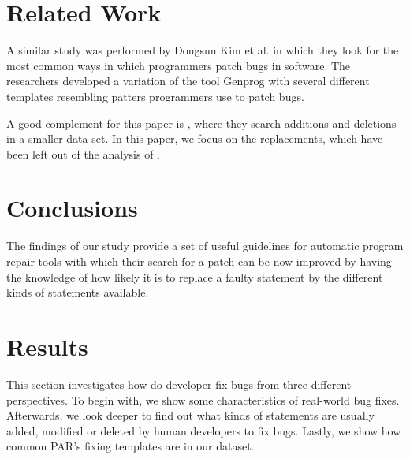 \documentclass{sig-alternate-05-2015}
\begin{document}
\section{Related Work}
A similar study was performed by Dongsun Kim et al. \cite{dongsun} in which they look for the most common ways in which programmers patch bugs in software. The researchers developed a variation of the tool Genprog \cite{weimer}\cite{claire} with several different templates resembling patters programmers use to patch bugs. 

A good complement for this paper is \cite{hao}, where they search additions and deletions in a smaller data set. In this paper, we focus on the replacements, which have been left out of the analysis of \cite{hao}. 



\section{Conclusions}
The findings of our study provide a set of useful guidelines for automatic program repair tools with which their search for a patch can be now improved by having the knowledge of how likely it is to replace a faulty statement by the different kinds of statements available.




%

%
%


\section{Results}

This section investigates how do developer fix bugs from three different
perspectives. To begin with, we show some characteristics of real-world bug
fixes.  Afterwards, we look deeper to find out what kinds of statements are
usually added, modified or deleted by human developers to fix bugs. Lastly, we
show how common PAR's fixing templates are in our dataset. 
\end{document}
